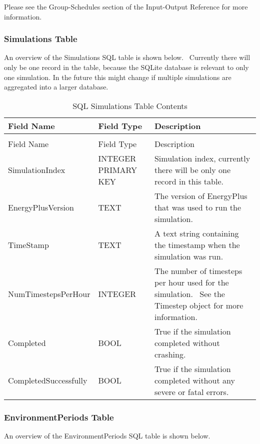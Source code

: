 Please see the Group-Schedules section of the Input-Output Reference for more information.

\subsubsection{Simulations Table}

An overview of the Simulations SQL table is shown below.  Currently there will only be one record in the table, because the SQLite database is relevant to only one simulation. In the future this might change if multiple simulations are aggregated into a larger database.

\begin{longtable}[c]{>{\raggedright}p{1.5in}>{\raggedright}p{1.5in}>{\raggedright}p{3.0in}}
\caption{SQL Simulations Table Contents \label{table:table-36.-sql-simulations-table-contents}} \tabularnewline
\toprule 
Field Name & Field Type & Description \tabularnewline
\midrule
\endfirsthead

\caption[]{SQL Simulations Table Contents} \tabularnewline
\toprule 
Field Name & Field Type & Description \tabularnewline
\midrule
\endhead

SimulationIndex & INTEGER PRIMARY KEY & Simulation index, currently there will be only one record in this table. \tabularnewline
EnergyPlus\-Version & TEXT & The version of EnergyPlus that was used to run the simulation. \tabularnewline
TimeStamp & TEXT & A text string containing the timestamp when the simulation was run. \tabularnewline
NumTimesteps\-Per\-Hour & INTEGER & The number of timesteps per hour used for the simulation.~ See the Timestep object for more information. \tabularnewline
Completed & BOOL & True if the simulation completed without crashing. \tabularnewline
Completed\-Successfully & BOOL & True if the simulation completed without any severe or fatal errors. \tabularnewline
\bottomrule
\end{longtable}

\subsubsection{EnvironmentPeriods Table}

An overview of the EnvironmentPeriods SQL table is shown below.

